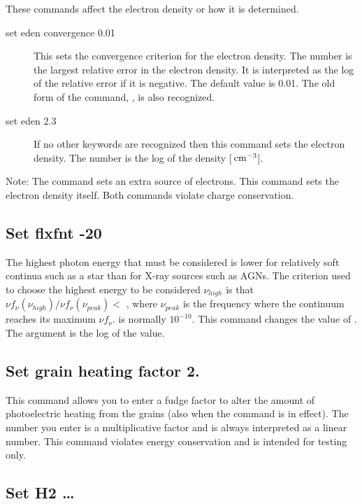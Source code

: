 These commands affect the electron density or how it is determined.
\begin{description}
\item[set eden convergence 0.01]
This sets the convergence criterion for the
electron density.
The number is the largest relative error in the electron
density.
It is interpreted as the log of the relative error if it is
negative.
The default value is 0.01.
The old form of the command,
, is also recognized.

\item[set eden 2.3]   If no other keywords are recognized then this command
sets the electron density.
The number is the log of the density [${\rm\thinspace cm^{-3}}$].
\end{description}

Note:  The  command sets an extra source
of electrons.
This command sets the electron density itself.
Both commands
violate charge conservation.

\subsection{Set flxfnt -20}

The highest photon energy that must be considered is lower for relatively
soft continua such as a star than for X-ray sources such as AGNs.
The
criterion used to choose the highest energy to be considered
$\nu_{high}$ is that
$\nu f_\nu (\nu_{high}) /\nu f_\nu (\nu_{peak}) < $ ,
where $\nu_{peak}$ is the frequency where
the continuum reaches its maximum $\nu f_\nu$.
 is normally $10^{-10}$.
This
command changes the value of .
The argument is the log of the value.

\subsection{Set grain heating factor 2.}

This command allows you to enter a fudge factor to alter the amount of
photoelectric heating from the grains (also when the 
command is in effect). The number you enter is a multiplicative factor and
is always interpreted as a linear number. This command violates energy
conservation and is intended for testing only.

\subsection{Set H2 \dots}

